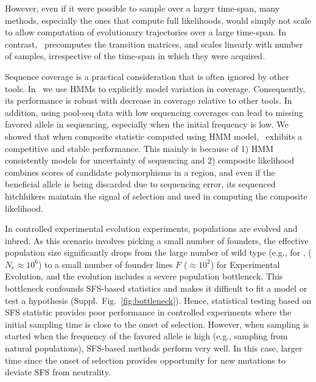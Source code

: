 However, even if it were
possible to sample over a larger time-span, many methods, especially
the ones that compute full likelihoods, would simply not scale to
allow computation of evolutionary trajectories over a large
time-span. In contrast, \comale\ precomputes the transition matrices,
and scales linearly with number of samples, irrespective of the
time-span in which they were acquired.



Sequence coverage is a practical consideration that is often ignored
by other tools.
In \comale\ we use HMMs to explicitly model variation
in coverage. Consequently, its performance is robust with decrease in
  coverage relative to other tools.
In addition, using pool-seq data with low sequencing coverages can lead to 
missing favored allele in sequencing, especially when the initial frequency is 
low. We showed that when composite statistic computed using HMM model, \comale\ 
exhibits a competitive and  stable performance. This mainly is because of 1) 
HMM consistently models for uncertainty of sequencing and 2) composite 
likelihood 
combines scores of candidate polymorphisms in a region, and even if the 
beneficial allele is being discarded due to sequencing error, its sequenced 
hitchhikers maintain the signal of selection and used in computing the 
composite likelihood.


In controlled experimental evolution experiments, populations are
evolved and inbred. As this scenario involves picking a small number
of founders, the effective population size significantly drops from
the large number of wild type (e.g., for \dmel,
($N_e\approx10^6$) to a small number of founder lines $F$ ($\approx
10^2$) for Experimental Evolution, and the evolution includes a severe
population bottleneck. This bottleneck confounds SFS-based statistics
and makes it difficult to fit a model or test a hypothesis
(Suppl.~Fig.~\ref{fig:bottleneck}).  
Hence, statistical testing based on SFS statistic provides poor performance in  
controlled experiments where the initial sampling time is close to the onset of 
selection. 
However, when sampling is started when the frequency of the favored allele is 
high (e.g., sampling from natural populations),
SFS-based methods perform  very well. In this case, larger time since the onset 
of selection provides opportunity for new mutations to deviate SFS from 
neutrality.	


